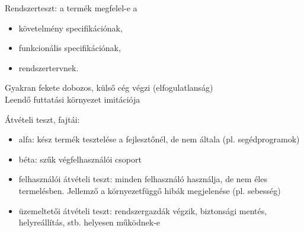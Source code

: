 \begin{frame}
  Rendszerteszt: a termék megfelel-e a
  \begin{itemize}
    \item követelmény specifikációnak,
    \item funkcionális specifikációnak,
    \item rendszertervnek.
  \end{itemize}
  Gyakran fekete dobozos, külső cég végzi (elfogulatlanság)\\
  Leendő futtatási környezet imitációja
\end{frame}

\begin{frame}
  Átvételi teszt, fajtái:
  \begin{itemize}
    \item alfa: kész termék tesztelése a fejlesztőnél, de nem általa (pl. segédprogramok)
    \item béta: szűk végfelhasználói csoport
    \item felhasználói átvételi teszt: minden felhasználó használja, de nem éles termelésben. Jellemző a környezetfüggő hibák 
    megjelenése (pl. sebesség)
    \item üzemeltetői átvételi teszt: rendszergazdák végzik, biztonsági mentés, helyreállítás, stb. helyesen működnek-e
  \end{itemize}
\end{frame}
